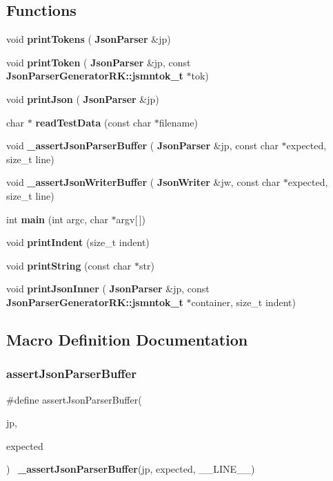 \subsection*{Functions}
\begin{DoxyCompactItemize}
\item 
void \textbf{ print\+Tokens} (\textbf{ Json\+Parser} \&jp)
\item 
void \textbf{ print\+Token} (\textbf{ Json\+Parser} \&jp, const \textbf{ Json\+Parser\+Generator\+R\+K\+::jsmntok\+\_\+t} $\ast$tok)
\item 
void \textbf{ print\+Json} (\textbf{ Json\+Parser} \&jp)
\item 
char $\ast$ \textbf{ read\+Test\+Data} (const char $\ast$filename)
\item 
void \textbf{ \+\_\+assert\+Json\+Parser\+Buffer} (\textbf{ Json\+Parser} \&jp, const char $\ast$expected, size\+\_\+t line)
\item 
void \textbf{ \+\_\+assert\+Json\+Writer\+Buffer} (\textbf{ Json\+Writer} \&jw, const char $\ast$expected, size\+\_\+t line)
\item 
int \textbf{ main} (int argc, char $\ast$argv[$\,$])
\item 
void \textbf{ print\+Indent} (size\+\_\+t indent)
\item 
void \textbf{ print\+String} (const char $\ast$str)
\item 
void \textbf{ print\+Json\+Inner} (\textbf{ Json\+Parser} \&jp, const \textbf{ Json\+Parser\+Generator\+R\+K\+::jsmntok\+\_\+t} $\ast$container, size\+\_\+t indent)
\end{DoxyCompactItemize}


\subsection{Macro Definition Documentation}
\mbox{\label{_json_test_8cpp_a59ef6dccb1baa8810627fc434b441fb8}} 
\subsubsection{assert\+Json\+Parser\+Buffer}
{\footnotesize\ttfamily \#define assert\+Json\+Parser\+Buffer(\begin{DoxyParamCaption}\item[{}]{jp,  }\item[{}]{expected }\end{DoxyParamCaption})~\textbf{ \+\_\+assert\+Json\+Parser\+Buffer}(jp, expected, \+\_\+\+\_\+\+L\+I\+N\+E\+\_\+\+\_\+)}



